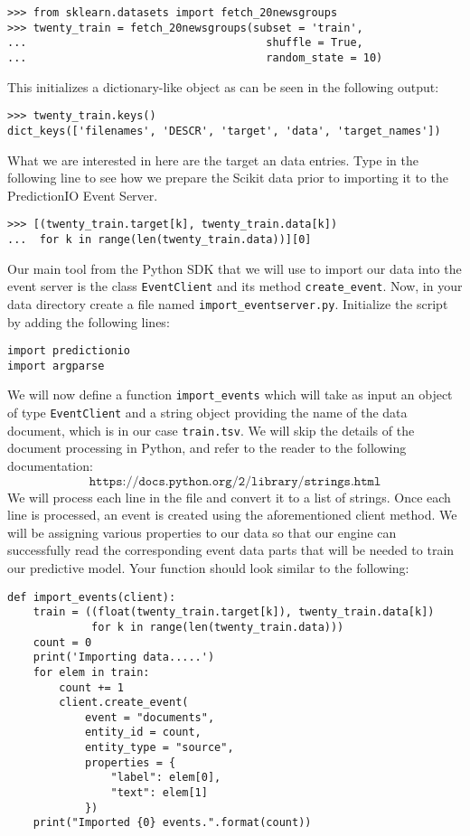 \documentclass[a4paper,12pt]{article}
\renewcommand{\tt}[1]{\texttt{#1}}
\newcommand{\3}{\left}
\newcommand{\4}{\right}
\renewcommand{\-}[1]{{}^{-#1}}
\begin{document}
\begin{verbatim}
>>> from sklearn.datasets import fetch_20newsgroups
>>> twenty_train = fetch_20newsgroups(subset = 'train',
...                                     shuffle = True,
...                                     random_state = 10)
\end{verbatim}

This initializes a dictionary-like object as can be seen in the following output:

\begin{verbatim}
>>> twenty_train.keys()
dict_keys(['filenames', 'DESCR', 'target', 'data', 'target_names'])
\end{verbatim}

What we are interested in here are the target an data entries. Type in the following line to see how we prepare the Scikit data prior to importing it to the PredictionIO Event Server.

\begin{verbatim}
>>> [(twenty_train.target[k], twenty_train.data[k]) 
...  for k in range(len(twenty_train.data))][0]
\end{verbatim}

Our main tool from the Python SDK that we will use to import our data into the event server is the class \tt{EventClient} and its method \tt{create\_event}. Now, in your data directory create a file named \tt{import\_eventserver.py}. Initialize the script by adding the following lines:
\begin{verbatim}
import predictionio
import argparse
\end{verbatim}
We will now define a function \tt{import\_events} which will take as input an object of type \tt{EventClient} and a string object providing the name of the data document, which is in our case \tt{train.tsv}. We will skip the details of the document processing in Python, and refer to the reader to the following documentation:
$$
\tt{https://docs.python.org/2/library/strings.html}
$$
We will process each line in the file and convert it to a list of strings. Once each line is processed, an event is created using the aforementioned client method. We will be assigning various properties to our data so that our engine can successfully read the corresponding event data parts that will be needed to train our predictive model. Your function should look similar to the following:
\begin{verbatim}
def import_events(client):
    train = ((float(twenty_train.target[k]), twenty_train.data[k])
             for k in range(len(twenty_train.data)))
    count = 0
    print('Importing data.....')
    for elem in train:
        count += 1
        client.create_event(
            event = "documents",
            entity_id = count,
            entity_type = "source",
            properties = {
                "label": elem[0],
                "text": elem[1]
            })
    print("Imported {0} events.".format(count))
\end{verbatim}
\end{document}
